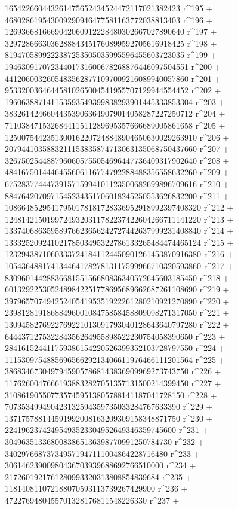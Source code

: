        165422660443261475652434524472117021382423 r^195 + 
       468028619543009290946477581163772038813403 r^196 + 
       1269366816669042060912228480302667027890640 r^197 + 
       3297286663036288843451760899592705616918425 r^198 + 
       8194705899222387253505035995596455603723035 r^199 + 
       19463091707234401731600678268876446097504551 r^200 + 
       44120600326054835628771097009216089940057860 r^201 + 
       95332003646445810265004541955707129944554452 r^202 + 
       196063887141153593549399838293901445333853304 r^203 + 
       383261424660443539063649079014058287227250712 r^204 + 
       711038471532684411511289695357666689005861658 r^205 + 
       1250075442351300162207248848904650630029263910 r^206 + 
       2079441035883211153835874713063135068750437660 r^207 + 
       3267502544887960605755054696447736409317902640 r^208 + 
       4841675014446455606116774792288488356558632260 r^209 + 
       6752837744473915715994101123500682699896709616 r^210 + 
       8847642070971545234351706018245250553626832200 r^211 + 
       10866485295417950178181728336952918992397408320 r^212 + 
       12481421501997249320311782237422604266711141220 r^213 + 
       13374068635958976623656242727442637999231408840 r^214 + 
       13332520924102178503495322786133265484474465124 r^215 + 
       12329438710603337241841124450901261453870916380 r^216 + 
       10543648817413446417827813117599966710320593860 r^217 + 
       8309601442883668155156680836340572645603185450 r^218 + 
       6013292253052489842251778695689662687261108690 r^219 + 
       3979657074942524054195351922261280210921270890 r^220 + 
       2398128191868849600108475858458809098271317050 r^221 + 
       1309458276922769221013091793040128643640797280 r^222 + 
       644437127532284356264955898522230754058390650 r^223 + 
       284161524411759386154220526399352103728797550 r^224 + 
       111530975488569656629213406611976466111201564 r^225 + 
       38683467304979459057868143836909969273743750 r^226 + 
       11762600476661938832827051357131500214399450 r^227 + 
       3108619055077357459513805788141187041728150 r^228 + 
       707353499490423132594359735033284767633390 r^229 + 
       137175788144591992008163209309158348871750 r^230 + 
       22419623742495493523304952649346359745600 r^231 + 
       3049635133680083865136398770991250784730 r^232 + 
       340297668737349571947111004864228716480 r^233 + 
       30614623900980436703939688692766510000 r^234 + 
       2172601921761280993320313808854839684 r^235 + 
       118140811072188070593113739267429900 r^236 + 
       4722769480455701328176811548226330 r^237 + 
